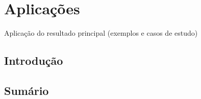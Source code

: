 \chapter{Aplicações}
\label{cap_aplicacoes}


Aplicação do resultado principal (exemplos e casos de estudo)

\section{Introdução}

\section{Sumário}